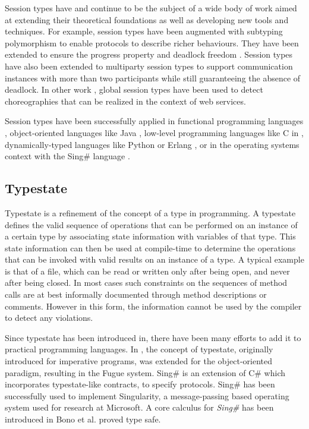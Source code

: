Session types have and continue to be the subject of a wide body of work aimed at extending their theoretical foundations as well as developing new tools and techniques. For example, session types have been augmented with subtyping polymorphism to enable protocols to describe richer behaviours\cite{GaySJ:substp}.
They have been extended to ensure the progress property and deadlock freedom \cite{dyl08}. Session types have also been extended to multiparty session types to support communication instances with more than two participants while still guaranteeing the absence of deadlock\cite{HondaK:mulast}. In other work \cite{ch07}, global session types have been used to detect choreographies that can be realized in the context of web services.

Session types have been successfully applied in functional programming languages \cite{VasconcelosVT:sestfm}, object-oriented languages like Java \cite{HuR:sesbdp, gay.vasconcelos.etal_modular-session-types}, low-level programming languages like C in \cite{NgYH12}, dynamically-typed languages like Python\cite{DBLP:conf/rv/NeykovaYH13} or Erlang \cite{erlang},  or in the operating systems context with the Sing\# language \cite{FahndrichM:lansfr}.


\subsection{Typestate}


Typestate is a refinement of the concept of a type in programming. A typestate defines the valid sequence of operations that can be performed on an instance of a certain type by associating state information with variables of that type. This state information can then be used at compile-time to determine the operations that can be invoked with valid results on an instance of a type.
A typical example is that of a file, which can be read or written only after being open, and never after being closed. In most cases such constraints on the sequences of method calls are at best informally documented through method descriptions or comments. However in this form, the information cannot be used by the compiler to detect any violations.

Since typestate has been introduced in\cite{typestates}, there have been many efforts to add it to practical programming languages. In \cite{FahndrichM:typo}, the concept of typestate, originally introduced for imperative programs, was extended for the object-oriented paradigm, resulting in the Fugue system. Sing\# \cite{FahndrichM:lansfr} is an extension of C\# which incorporates typestate-like contracts, to specify protocols. Sing\# has been successfully used to implement Singularity, a message-passing based operating system used for research at Microsoft. A core calculus for \emph{Sing\#} has been introduced in Bono {et al.} \cite{BonoV:typcmp} proved type safe.


